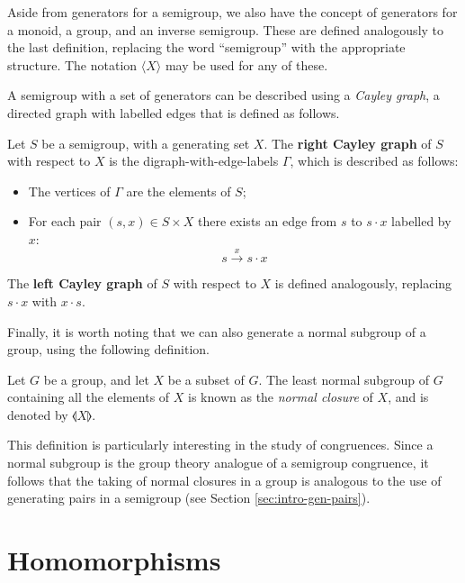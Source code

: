 Aside from generators for a semigroup, we also have the concept of generators
for a monoid, a group, and an inverse semigroup.  These are defined analogously
to the last definition, replacing the word ``semigroup'' with the appropriate
structure.  The notation $\langle X \rangle$ may be used for any of these.

A semigroup with a set of generators can be described using a \textit{Cayley
  graph}, a directed graph with labelled edges that is defined as follows.

\begin{definition}
  \label{def:cayley-graph}
  Let $S$ be a semigroup, with a generating set $X$.  The \textbf{right Cayley
    graph} of $S$ with respect to $X$ is the digraph-with-edge-labels $\Gamma$,
  which is described as follows:
  \begin{itemize}
  \item The vertices of $\Gamma$ are the elements of $S$;
  \item For each pair $(s, x) \in S \times X$ there exists an edge from $s$ to
    $s \cdot x$ labelled by $x$:
    $$s \overset{x}{\longrightarrow} s \cdot x$$
  \end{itemize}
  The \textbf{left Cayley graph} of $S$ with respect to $X$ is defined
  analogously, replacing $s \cdot x$ with $x \cdot s$.
\end{definition}

Finally, it is worth noting that we can also generate a normal subgroup of a
group, using the following definition.

\begin{definition}
  \label{def:normal-closure}
  \label{normal closure}
  Let $G$ be a group, and let $X$ be a subset of $G$.  The least normal subgroup
  of $G$ containing all the elements of $X$ is known as the \textit{normal
    closure} of $X$, and is denoted by $\llangle X \rrangle$.
\end{definition}

This definition is particularly interesting in the study of congruences.  Since
a normal subgroup is the group theory analogue of a semigroup congruence, it
follows that the taking of normal closures in a group is analogous to the use of
generating pairs in a semigroup (see Section \ref{sec:intro-gen-pairs}).

\section{Homomorphisms}
\label{sec:homomorphisms}

